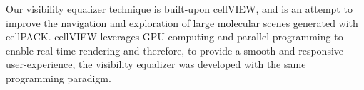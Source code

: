 Our visibility equalizer technique is built-upon cellVIEW, and is an attempt to improve the navigation and exploration of large molecular scenes generated with cellPACK.
cellVIEW leverages GPU computing and parallel programming to enable real-time rendering and therefore, to provide a smooth and responsive user-experience, the visibility equalizer was developed with the same programming paradigm.




